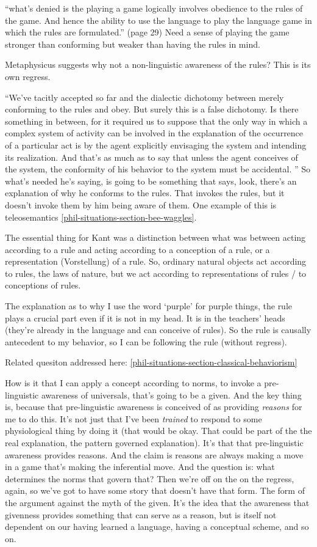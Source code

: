 ``what's denied is the playing a game logically involves obedience to the rules of the game. And hence the ability to use the language to play the language game in which the rules are formulated.'' (page 29) Need a sense of playing the game stronger than conforming but weaker than having the rules in mind.

Metaphysicus suggests why not a non-linguistic awareness of the rules? This is its own regress.

``We've tacitly accepted so far and the dialectic dichotomy between merely conforming to the rules and obey. But surely this is a false dichotomy. Is there something in between, for it required us to suppose that the only way in which a complex system of activity can be involved in the explanation of the occurrence of a particular act is by the agent explicitly envisaging the system and intending its realization. And that's as much as to say that unless the agent conceives of the system, the conformity of his behavior to the system must be accidental. '' So what's needed he's saying, is going to be something that says, look, there's an explanation of why he conforms to the rules. That invokes the rules, but it doesn't invoke them by him being aware of them. One example of this is teleosemantics \ref{phil-situations-section-bee-waggles}.

The essential thing for Kant was a distinction between what was between acting according to a rule and acting according to a conception of a rule, or a representation (Vorstellung) of a rule. So, ordinary natural objects act according to rules, the laws of nature, but we act according to representations of rules / to conceptions of rules.

The explanation as to why I use the word `purple' for purple things, the rule plays a crucial part even if it is not in my head. It is in the teachers' heads (they're already in the language and can conceive of rules). So the rule is causally antecedent to my behavior, so I can be following the rule (without regress).

Related quesiton addressed here: \ref{phil-situations-section-classical-behaviorism}

How is it that I can apply a concept according to norms, to invoke a pre-linguistic awareness of universals, that's going to be a given. And the key thing is, because that pre-linguistic awareness is conceived of as providing \emph{reasons} for me to do this. It's not just that I've been \emph{trained} to respond to some physiological thing by doing it (that would be okay. That could be part of the the real explanation, the pattern governed explanation). It's that that pre-linguistic awareness provides reasons. And the claim is reasons are always making a move in a game that's making the inferential move. And the question is: what determines the norms that govern that? Then we're off on the on the regress, again, so we've got to have some story that doesn't have that form. The form of the argument against the myth of the given. It's the idea that the awareness that givenness provides something that can serve as a reason, but is itself not dependent on our having learned a language, having a conceptual scheme, and so on.

